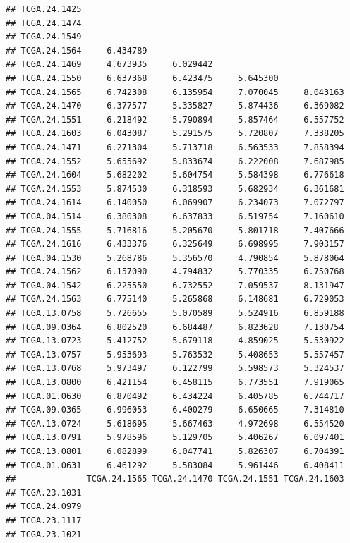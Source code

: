 \documentclass[UTF8]{beamer}\usepackage[]{graphicx}\usepackage[]{color}
\makeatletter
\newenvironment{kframe}{%
 \def\at@end@of@kframe{}%
 \ifinner\ifhmode%
  \def\at@end@of@kframe{\end{minipage}}%
  \begin{minipage}{\columnwidth}%
 \fi\fi%
 \def\FrameCommand##1{\hskip\@totalleftmargin \hskip-\fboxsep
 \colorbox{shadecolor}{##1}\hskip-\fboxsep
     \hskip-\linewidth \hskip-\@totalleftmargin \hskip\columnwidth}%
 \MakeFramed {\advance\hsize-\width
   \@totalleftmargin\z@ \linewidth\hsize
   \@setminipage}}%
 {\par\unskip\endMakeFramed%
 \at@end@of@kframe}
\newenvironment{knitrout}{}{} %
\makeatother
\begin{document}
\begin{frame}[fragile]
\begin{knitrout}
\begin{kframe}
\begin{verbatim}
## TCGA.24.1425                                                    
## TCGA.24.1474                                                    
## TCGA.24.1549                                                    
## TCGA.24.1564     6.434789                                       
## TCGA.24.1469     4.673935     6.029442                          
## TCGA.24.1550     6.637368     6.423475     5.645300             
## TCGA.24.1565     6.742308     6.135954     7.070045     8.043163
## TCGA.24.1470     6.377577     5.335827     5.874436     6.369082
## TCGA.24.1551     6.218492     5.790894     5.857464     6.557752
## TCGA.24.1603     6.043087     5.291575     5.720807     7.338205
## TCGA.24.1471     6.271304     5.713718     6.563533     7.858394
## TCGA.24.1552     5.655692     5.833674     6.222008     7.687985
## TCGA.24.1604     5.682202     5.604754     5.584398     6.776618
## TCGA.24.1553     5.874530     6.318593     5.682934     6.361681
## TCGA.24.1614     6.140050     6.069907     6.234073     7.072797
## TCGA.04.1514     6.380308     6.637833     6.519754     7.160610
## TCGA.24.1555     5.716816     5.205670     5.801718     7.407666
## TCGA.24.1616     6.433376     6.325649     6.698995     7.903157
## TCGA.04.1530     5.268786     5.356570     4.790854     5.878064
## TCGA.24.1562     6.157090     4.794832     5.770335     6.750768
## TCGA.04.1542     6.225550     6.732552     7.059537     8.131947
## TCGA.24.1563     6.775140     5.265868     6.148681     6.729053
## TCGA.13.0758     5.726655     5.070589     5.524916     6.859188
## TCGA.09.0364     6.802520     6.684487     6.823628     7.130754
## TCGA.13.0723     5.412752     5.679118     4.859025     5.530922
## TCGA.13.0757     5.953693     5.763532     5.408653     5.557457
## TCGA.13.0768     5.973497     6.122799     5.598573     5.324537
## TCGA.13.0800     6.421154     6.458115     6.773551     7.919065
## TCGA.01.0630     6.870492     6.434224     6.405785     6.744717
## TCGA.09.0365     6.996053     6.400279     6.650665     7.314810
## TCGA.13.0724     5.618695     5.667463     4.972698     6.554520
## TCGA.13.0791     5.978596     5.129705     5.406267     6.097401
## TCGA.13.0801     6.082899     6.047741     5.826307     6.704391
## TCGA.01.0631     6.461292     5.583084     5.961446     6.408411
##              TCGA.24.1565 TCGA.24.1470 TCGA.24.1551 TCGA.24.1603
## TCGA.23.1031                                                    
## TCGA.24.0979                                                    
## TCGA.23.1117                                                    
## TCGA.23.1021                                                    

\end{verbatim}
\end{kframe}
\end{knitrout}
\end{frame}
\end{document}

